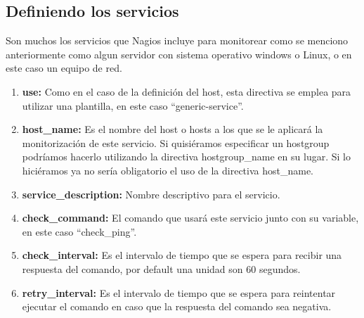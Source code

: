 \documentclass[12pt]{book}
\begin{document}
    \subsection{ Definiendo los servicios }
    Son muchos los servicios que Nagios incluye para monitorear como se menciono anteriormente como algun servidor con
    sistema operativo windows o Linux, o en este caso un equipo de red.
    \vspace{-15mm}
    \begin{alltt}
      
    \end{alltt}
    \vspace{-10mm}
    \begin{enumerate}
      \item {\bf use: } Como en el caso de la definición del host, esta directiva se emplea para utilizar una plantilla,
      en este caso “generic-service”.

      \item {\bf host\_name: } Es el nombre del host o hosts a los que se le aplicará la monitorización de este
      servicio. Si quisiéramos especificar un hostgroup podríamos hacerlo utilizando la directiva
      hostgroup\_name en su lugar. Si lo hiciéramos ya no sería obligatorio el uso de la directiva
      host\_name.
      \item {\bf service\_description: } Nombre descriptivo para el servicio.
      \item {\bf check\_command: } El comando que usará este servicio junto con su variable, en este caso “check\_ping”.
      \item {\bf check\_interval: } Es el intervalo de tiempo que se espera para recibir una respuesta del comando, por default 
      una unidad son 60 segundos.
      \item {\bf retry\_interval: } Es el intervalo de tiempo que se espera para reintentar ejecutar el comando en caso 
                                    que la respuesta del comando sea negativa.

    \end{enumerate}
\end{document}
